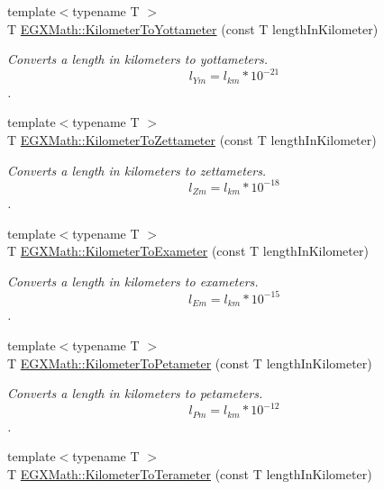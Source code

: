 \begin{DoxyCompactItemize}
{\footnotesize template$<$typename T $>$ }\\T \mbox{\hyperlink{group___e_g_x_math-_conversions-_length_conversions-_s_i-_kilometer-_s_i_gaf29070fac412b7a92466866b2ae32337}{E\+G\+X\+Math\+::\+Kilometer\+To\+Yottameter}} (const T length\+In\+Kilometer)
\begin{DoxyCompactList}\small\item\em Converts a length in kilometers to yottameters. \[ l_{Ym}=l_{km} * 10^{-21} \]. \end{DoxyCompactList}\item 
{\footnotesize template$<$typename T $>$ }\\T \mbox{\hyperlink{group___e_g_x_math-_conversions-_length_conversions-_s_i-_kilometer-_s_i_ga85792ebcdaa5c8289da781417c88963d}{E\+G\+X\+Math\+::\+Kilometer\+To\+Zettameter}} (const T length\+In\+Kilometer)
\begin{DoxyCompactList}\small\item\em Converts a length in kilometers to zettameters. \[ l_{Zm}=l_{km} * 10^{-18} \]. \end{DoxyCompactList}\item 
{\footnotesize template$<$typename T $>$ }\\T \mbox{\hyperlink{group___e_g_x_math-_conversions-_length_conversions-_s_i-_kilometer-_s_i_gae947c63c1b914d80d7ed3b35df15d02a}{E\+G\+X\+Math\+::\+Kilometer\+To\+Exameter}} (const T length\+In\+Kilometer)
\begin{DoxyCompactList}\small\item\em Converts a length in kilometers to exameters. \[ l_{Em}=l_{km} * 10^{-15} \]. \end{DoxyCompactList}\item 
{\footnotesize template$<$typename T $>$ }\\T \mbox{\hyperlink{group___e_g_x_math-_conversions-_length_conversions-_s_i-_kilometer-_s_i_ga79a0e22448e08eeb755577316635058a}{E\+G\+X\+Math\+::\+Kilometer\+To\+Petameter}} (const T length\+In\+Kilometer)
\begin{DoxyCompactList}\small\item\em Converts a length in kilometers to petameters. \[ l_{Pm}=l_{km} * 10^{-12} \]. \end{DoxyCompactList}\item 
{\footnotesize template$<$typename T $>$ }\\T \mbox{\hyperlink{group___e_g_x_math-_conversions-_length_conversions-_s_i-_kilometer-_s_i_gadc147bd94e976f0577e7ca544ed81bf9}{E\+G\+X\+Math\+::\+Kilometer\+To\+Terameter}} (const T length\+In\+Kilometer)

\end{DoxyCompactItemize}
